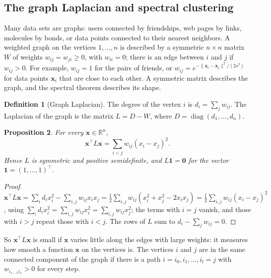 \documentclass[11pt]{article}
\newcommand{\norm}[1]{\lVert #1 \rVert}
\theoremstyle{definition}
\newtheorem{definition}{Definition}[section]
\theoremstyle{plain}
\newtheorem{proposition}[definition]{Proposition}
\theoremstyle{remark}
\DeclareMathOperator{\diag}{diag}
\begin{document}
\subsection{The graph Laplacian and spectral clustering}\label{sec:laplacian}

Many data sets are graphs: users connected by friendships, web pages by links, molecules by bonds, or data points connected to their nearest neighbors. A weighted graph on the vertices $1, \ldots, n$ is described by a symmetric $n \times n$ matrix $W$ of weights $w_{ij} = w_{ji} \geq 0$, with $w_{ii} = 0$; there is an edge between $i$ and $j$ if $w_{ij} > 0$. For example, $w_{ij} = 1$ for the pairs of friends, or $w_{ij} = e^{-\norm{\mathbf{x}_i - \mathbf{x}_j}^2/(2s^2)}$ for data points $\mathbf{x}_i$ that are close to each other. A symmetric matrix describes the graph, and the spectral theorem describes its shape.

\begin{definition}[Graph Laplacian]\label{def:laplacian}
    The degree of the vertex $i$ is $d_i = \sum_j w_{ij}$. The Laplacian of the graph is the matrix $L = D - W$, where $D = \diag(d_1, \ldots, d_n)$.
\end{definition}

\begin{proposition}\label{prop:laplacian}
    For every $\mathbf{x} \in \mathbb{R}^n$,
    \[\mathbf{x}^\top L\mathbf{x} = \sum_{i < j} w_{ij}(x_i - x_j)^2.\]
    Hence $L$ is symmetric and positive semidefinite, and $L\mathbf{1} = \mathbf{0}$ for the vector $\mathbf{1} = (1, \ldots, 1)^\top$.
\end{proposition}

\begin{proof}
    $\mathbf{x}^\top L\mathbf{x} = \sum_i d_ix_i^2 - \sum_{i, j} w_{ij}x_ix_j = \frac{1}{2}\sum_{i, j} w_{ij}(x_i^2 + x_j^2 - 2x_ix_j) = \frac{1}{2}\sum_{i, j} w_{ij}(x_i - x_j)^2$, using $\sum_i d_ix_i^2 = \sum_{i, j} w_{ij}x_i^2 = \sum_{i, j} w_{ij}x_j^2$; the terms with $i = j$ vanish, and those with $i > j$ repeat those with $i < j$. The rows of $L$ sum to $d_i - \sum_j w_{ij} = 0$.
\end{proof}

So $\mathbf{x}^\top L\mathbf{x}$ is small if $\mathbf{x}$ varies little along the edges with large weights: it measures how smooth a function $\mathbf{x}$ on the vertices is. The vertices $i$ and $j$ are in the same connected component of the graph if there is a path $i = i_0, i_1, \ldots, i_l = j$ with $w_{i_{s-1}i_s} > 0$ for every step.
\end{document}
